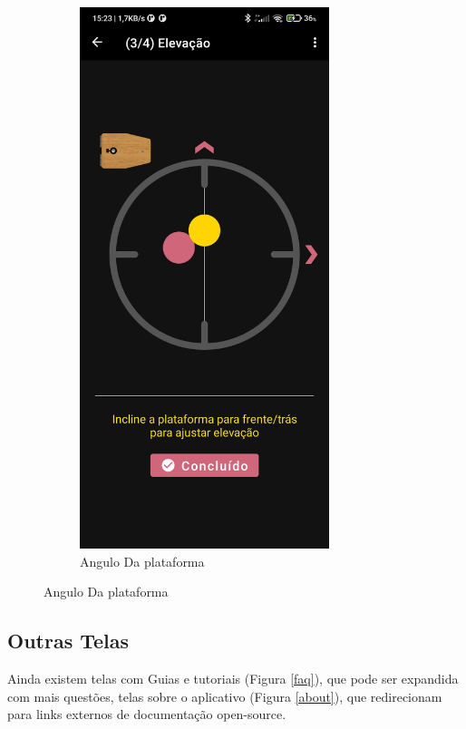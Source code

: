 \begin{figure}[!htb]
\begin{subfigure}[b]{0.3\textwidth}
		\includegraphics[width=0.8\textwidth]{figuras/desAplicativo/elevacao}
		\caption{Angulo Da plataforma}
		\label{menubus}
	\end{subfigure}
\end{figure}

\subsection{Outras Telas}

Ainda existem telas com Guias e tutoriais (Figura \ref{faq}), que pode ser expandida com mais questões, telas sobre o aplicativo (Figura \ref{about}), que redirecionam para links externos de documentação open-source.

